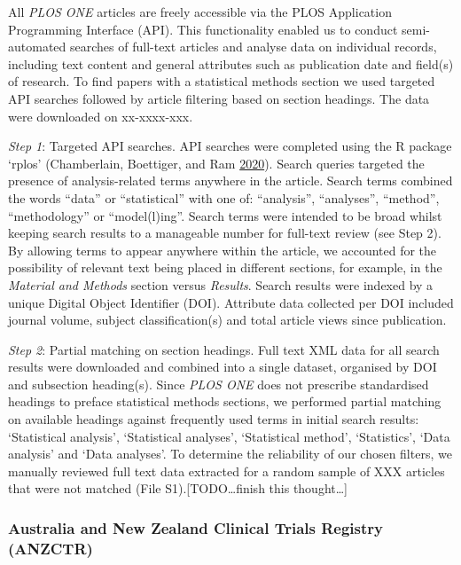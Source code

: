 \documentclass[
]{article}
\begin{document}
All \emph{PLOS ONE} articles are freely accessible via the PLOS
Application Programming Interface (API). This functionality enabled us
to conduct semi-automated searches of full-text articles and analyse
data on individual records, including text content and general
attributes such as publication date and field(s) of research. To find
papers with a statistical methods section we used targeted API searches
followed by article filtering based on section headings. The data were
downloaded on xx-xxxx-xxx.

\emph{Step 1}: Targeted API searches. API searches were completed using
the R package `rplos' (Chamberlain, Boettiger, and Ram
\protect\hyperlink{ref-rplos}{2020}). Search queries targeted the
presence of analysis-related terms anywhere in the article. Search terms
combined the words ``data'' or ``statistical'' with one of:
``analysis'', ``analyses'', ``method'', ``methodology'' or
``model(l)ing''. Search terms were intended to be broad whilst keeping
search results to a manageable number for full-text review (see Step 2).
By allowing terms to appear anywhere within the article, we accounted
for the possibility of relevant text being placed in different sections,
for example, in the \emph{Material and Methods} section versus
\emph{Results}. Search results were indexed by a unique Digital Object
Identifier (DOI). Attribute data collected per DOI included journal
volume, subject classification(s) and total article views since
publication.

\emph{Step 2}: Partial matching on section headings. Full text XML data
for all search results were downloaded and combined into a single
dataset, organised by DOI and subsection heading(s). Since \emph{PLOS
ONE} does not prescribe standardised headings to preface statistical
methods sections, we performed partial matching on available headings
against frequently used terms in initial search results: `Statistical
analysis', `Statistical analyses', `Statistical method', `Statistics',
`Data analysis' and `Data analyses'. To determine the reliability of our
chosen filters, we manually reviewed full text data extracted for a
random sample of XXX articles that were not matched (File
S1).{[}TODO\ldots finish this thought\ldots{]}

\hypertarget{australia-and-new-zealand-clinical-trials-registry-anzctr}{%
\subsubsection{Australia and New Zealand Clinical Trials Registry
(ANZCTR)}\label{australia-and-new-zealand-clinical-trials-registry-anzctr}}
\end{document}
